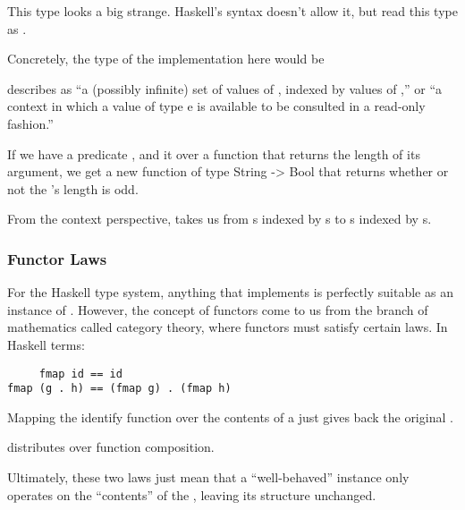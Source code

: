 \begin{notelist}
    \item \textbf{}
    \begin{notelist}
        \item This type looks a big strange. Haskell's syntax doesn't allow it, but read this type as .
        \item Concretely, the type of the  implementation here would be 
        \item \cite{typeclassopedia} describes  as ``a (possibly infinite) set of values of , indexed by
              values of ,'' or ``a context in which a value of type e is available to be consulted in a read-only fashion.''
        \item If we have a predicate , and  it over a function 
              that returns the length of its argument, we get a new function of type {String -> Bool} that returns whether or
              not the 's length is odd.
        \item From the context perspective,  takes us from s indexed by s to s
              indexed by s.
    \end{notelist}
\end{notelist}

\subsubsection{Functor Laws}

For the Haskell type system, anything that implements  is perfectly suitable
as an instance of . However, the concept of functors come to us from the branch of mathematics called
category theory, where functors must satisfy certain laws. In Haskell terms:

\begin{lstlisting}
     fmap id == id
fmap (g . h) == (fmap g) . (fmap h)
\end{lstlisting}

\begin{notelist}
    \item Mapping the identify function over the contents of a  just gives back the original .
    \item {} distributes over function composition.
    \item Ultimately, these two laws just mean that a ``well-behaved''  instance only operates on the
          ``contents'' of the , leaving its structure unchanged.
\end{notelist}

